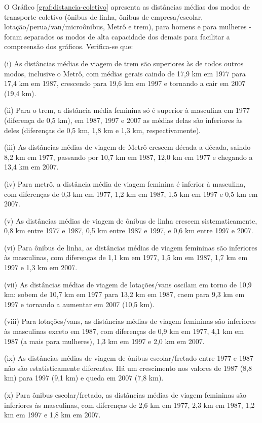 \newpage

O Gráfico \ref{graf:distancia-coletivo} apresenta as distâncias médias dos modos de transporte coletivo (ônibus de linha, ônibus de empresa/escolar, lotação/perua/van/microônibus, Metrô e trem), para homens e para mulheres - foram separados os modos de alta capacidade dos demais para facilitar a compreensão dos gráficos. Verifica-se que:
\begin{compactitem}[]
\item (i) As distâncias médias de viagem de trem são superiores às de todos outros modos, inclusive o Metrô, com médias gerais caindo de 17,9 km em 1977 para 17,4 km em 1987, crescendo para 19,6 km em 1997 e tornando a cair em 2007 (19,4 km).
\item (ii) Para o trem, a distância média feminina só é superior à masculina em 1977 (diferença de 0,5 km), em 1987, 1997 e 2007 as médias delas são inferiores às deles (diferenças de 0,5 km, 1,8 km e 1,3 km, respectivamente).
\item (iii) As distâncias médias de viagem de Metrô crescem década a década, saindo 8,2 km em 1977, passando por 10,7 km em 1987, 12,0 km em 1977 e chegando a 13,4 km em 2007.
\item (iv) Para metrô, a distância média de viagem feminina é inferior à masculina, com diferenças de 0,3 km em 1977, 1,2 km em 1987, 1,5 km em 1997 e 0,5 km em 2007.
\item (v) As distâncias médias de viagem de ônibus de linha crescem sistematicamente, 0,8 km entre 1977 e 1987, 0,5 km entre 1987 e 1997, e 0,6 km entre 1997 e 2007.
\item (vi) Para ônibus de linha, as distâncias médias de viagem femininas são inferiores às masculinas, com diferenças de 1,1 km em 1977, 1,5 km em 1987, 1,7 km em 1997 e 1,3 km em 2007.
\item (vii) As distâncias médias de viagem de lotações/vans oscilam em torno de 10,9 km: sobem de 10,7 km em 1977 para 13,2 km em 1987, caem para 9,3 km em 1997 e tornando a aumentar em 2007 (10,5 km).
\item (viii) Para lotações/vans, as distâncias médias de viagem femininas são inferiores às masculinas exceto em 1987, com diferenças de 0,9 km em 1977, 4,1 km em 1987 (a mais para mulheres), 1,3 km em 1997 e 2,0 km em 2007.
\item (ix) As distâncias médias de viagem de ônibus escolar/fretado entre 1977 e 1987 não são estatisticamente diferentes. Há um crescimento nos valores de 1987 (8,8 km) para 1997 (9,1 km) e queda em 2007 (7,8 km).

\item (x) Para ônibus escolar/fretado, as distâncias médias de viagem femininas são inferiores às masculinas, com diferenças de 2,6 km em 1977, 2,3 km em 1987, 1,2 km em 1997 e 1,8 km em 2007.

\end{compactitem}

